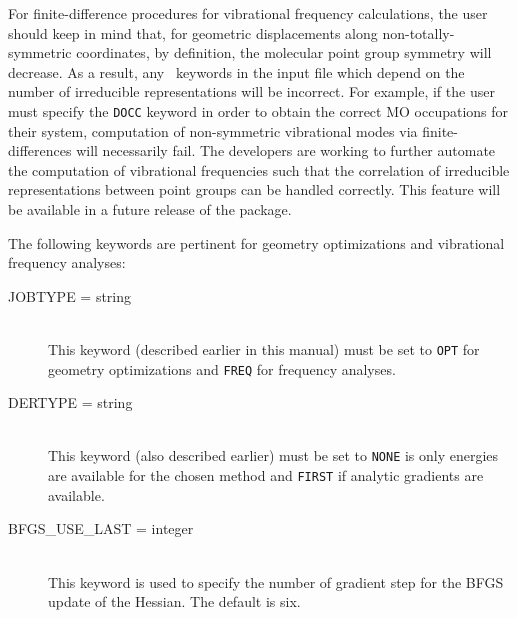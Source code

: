 For finite-difference procedures for vibrational frequency calculations,
the user should keep in mind that, for geometric displacements along
non-totally-symmetric coordinates, by definition, the molecular point
group symmetry will decrease.  As a result, any \PSIthree\ keywords in
the input file which depend on the number of irreducible representations
will be incorrect.  For example, if the user must specify the {\tt DOCC}
keyword in order to obtain the correct MO occupations for their system,
computation of non-symmetric vibrational modes via finite-differences
will necessarily fail.  The developers are working to further automate
the computation of vibrational frequencies such that the correlation
of irreducible representations between point groups can be handled
correctly.  This feature will be available in a future release of the
package.

The following keywords are pertinent for geometry optimizations and
vibrational frequency analyses:
\begin{description}
\item[JOBTYPE = string]\mbox{}\\
This keyword (described earlier in this manual) must be set to
{\tt OPT} for geometry optimizations and {\tt FREQ} for frequency analyses.
\item[DERTYPE = string]\mbox{}\\
This keyword (also described earlier) must be set to {\tt NONE} is only
energies are available for the chosen method and {\tt FIRST} if analytic
gradients are available.
\item[BFGS\_USE\_LAST = integer]\mbox{}\\ This keyword is used to specify
the number of gradient step for the BFGS update of the Hessian.  The default
is six.  
\end{description}
